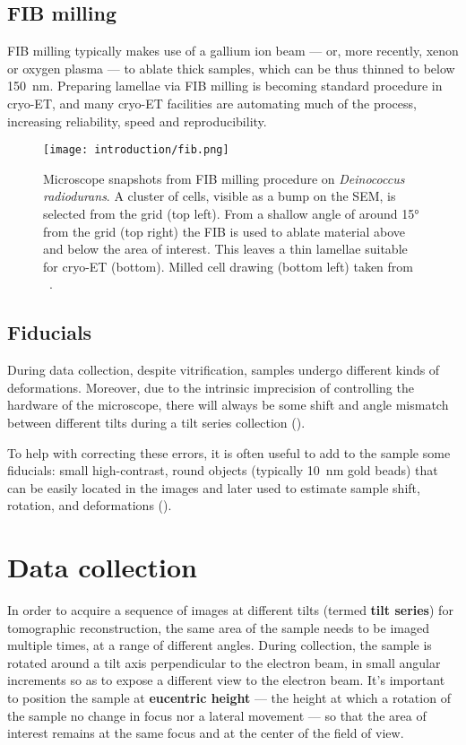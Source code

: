 \subsection{FIB milling}
FIB milling typically makes use of a gallium ion beam --- or, more recently, xenon or oxygen plasma --- to ablate thick samples, which can be thus thinned to below \qty{150}{\nano\meter}.
Preparing lamellae via FIB milling is becoming standard procedure in cryo-ET, and many cryo-ET facilities are automating much of the process, increasing reliability, speed and reproducibility.

\begin{figure}[ht]
    \centering
    \texttt{[image: introduction/fib.png]}
    \caption[FIB milling]{Microscope snapshots from FIB milling procedure on \textit{Deinococcus radiodurans}. A cluster of cells, visible as a bump on the SEM, is selected from the grid (top left). From a shallow angle of around \ang{15} from the grid (top right) the FIB is used to ablate material above and below the area of interest. This leaves a thin lamellae suitable for cryo-ET (bottom). Milled cell drawing (bottom left) taken from ~\citet{villaOpeningWindowsCell2013}.}
    \label{fig:et_fib_milling}
\end{figure}


\subsection{Fiducials}\label{fiducials}
During data collection, despite vitrification, samples undergo different kinds of deformations.
Moreover, due to the intrinsic imprecision of controlling the hardware of the microscope, there will always be some shift and angle mismatch between different tilts during a tilt series collection ().

To help with correcting these errors, it is often useful to add to the sample some fiducials: small high-contrast, round objects (typically \qty{10}{nm} gold beads) that can be easily located in the images and later used to estimate sample shift, rotation, and deformations ().

\section{Data collection}\label{et_data_collection}
In order to acquire a sequence of images at different tilts (termed \textbf{tilt series}) for tomographic reconstruction, the same area of the sample needs to be imaged multiple times, at a range of different angles.
During collection, the sample is rotated around a tilt axis perpendicular to the electron beam, in small angular increments so as to expose a different view to the electron beam.
It's important to position the sample at \textbf{eucentric height} --- the height at which a rotation of the sample no change in focus nor a lateral movement --- so that the area of interest remains at the same focus and at the center of the field of view.

